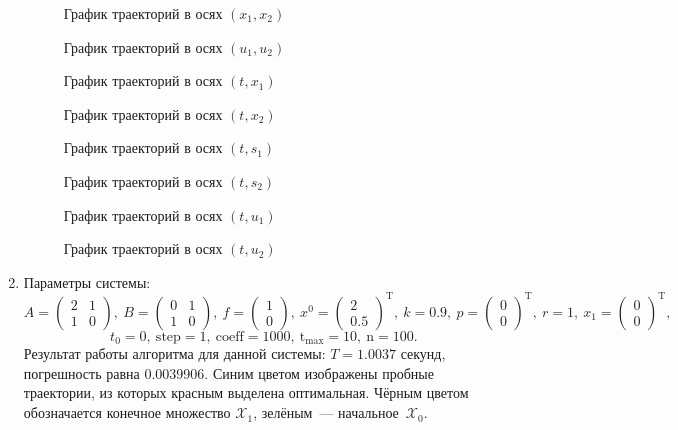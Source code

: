 \documentclass[a4paper,11pt]{article}
\begin{document}
\begin{enumerate}
\begin{figure}[H]
\caption{График траекторий в осях $(x_1, x_2)$}
\end{figure}
\begin{figure}[H]
\caption{График траекторий в осях $(u_1, u_2)$}
\end{figure}
\begin{figure}[H]
\caption{График траекторий в осях $(t, x_1)$}
\end{figure}
\begin{figure}[H]
\caption{График траекторий в осях $(t, x_2)$}
\end{figure}
\begin{figure}[H]
\caption{График траекторий в осях $(t, s_1)$}
\end{figure}
\begin{figure}[H]
\caption{График траекторий в осях $(t, s_2)$}
\end{figure}
\begin{figure}[H]
\caption{График траекторий в осях $(t, u_1)$}
\end{figure}
\begin{figure}[H]
\caption{График траекторий в осях $(t, u_2)$}
\end{figure}

\newpage
\item Параметры системы: 
\[A = \begin{pmatrix}
  2 & 1 \\
  1 & 0
\end{pmatrix}, \ 
B = \begin{pmatrix}
  0 & 1 \\
  1 & 0
\end{pmatrix}, \ 
f = \begin{pmatrix}
  1\\
  0
\end{pmatrix}, \ 
x^0 = \begin{pmatrix}
  2\\
  0.5
\end{pmatrix}^\mathrm{T}, \ 
k = 0.9, \  
p = \begin{pmatrix}
  0\\
  0
\end{pmatrix}^\mathrm{T}, \ 
r = 1, \  
x_1 = \begin{pmatrix}
  0\\
  0
\end{pmatrix}^\mathrm{T}, \] 
\[t_0 = 0, \  \mathrm{step} = 1, \  \mathrm{coeff} = 1000, \ \mathrm{t_{max}} = 10, \  \mathrm{n} = 100.\] 
Результат работы алгоритма для данной системы: $T = 1.0037$ секунд, погрешность равна 0.0039906. Синим цветом изображены пробные траектории, из которых красным выделена оптимальная. Чёрным цветом обозначается конечное множество $\mathcal{X}_1$, зелёным~--- начальное~$\mathcal{X}_0$.


\end{enumerate}
\end{document}
